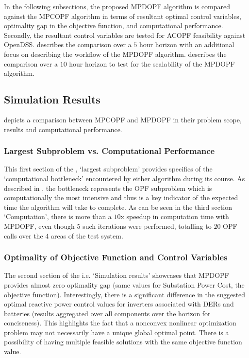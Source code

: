 \documentclass[../../outputs/main.tex]{subfiles}
\begin{document}
In the following subsections, the proposed MPDOPF algorithm is compared against the MPCOPF algorithm in terms of resultant optimal control variables, optimality gap in the objective function, and computational performance. Secondly, the resultant control variables are tested for ACOPF feasibility against OpenDSS.  describes the comparison over a $5$ hour horizon with an additional focus on describing the workflow of the MPDOPF algorithm.  describes the comparison over a $10$ hour horizon to test for the scalability of the MPDOPF algorithm.


\subsection{Simulation Results} \label{subsec:simulationResults}


 depicts a comparison between MPCOPF and MPDOPF in their problem scope, results and computational performance.

\subsubsection{Largest Subproblem vs. Computational Performance}
This first section of the , `largest subproblem' provides specifics of the `computational bottleneck' encountered by either algorithm during its course. As described in , the bottleneck represents the OPF subproblem which is computationally the most intensive and thus is a key indicator of the expected time the algorithm will take to complete. As can be seen in the third section `Computation', there is more than a $10$x speedup in computation time with MPDOPF, even though $5$ such iterations were performed, totalling to $20$ OPF calls over the $4$ areas of the test system.      

\subsubsection{Optimality of Objective Function and Control Variables}
The second section of the  i.e. `Simulation results' showcases that MPDOPF provides almost zero optimality gap (same values for Substation Power Cost, the objective function). Interestingly, there is a significant difference in the suggested optimal reactive power control values for inverters associated with DERs and batteries (results aggregated over all components over the horizon for conciseness). This highlights the fact that a nonconvex nonlinear optimization problem may not necessarily have a unique global optimal point. There is a possibility of having multiple feasible solutions with the same objective function value. 
\end{document}
